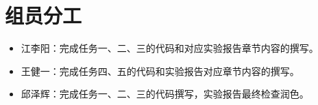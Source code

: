\documentclass{CST_CryptoIntro}
\begin{document}
\maketitle
\thispagestyle{fancy}
\newpage

\tableofcontents
\newpage

\section{组员分工}
\begin{itemize}
    \item 江李阳：完成任务一、二、三的代码和对应实验报告章节内容的撰写。
    \item 王健一：完成任务四、五的代码和实验报告对应章节内容的撰写。
    \item 邱泽辉：完成任务一、二、三的代码撰写，实验报告最终检查润色。
\end{itemize}













\end{document}
